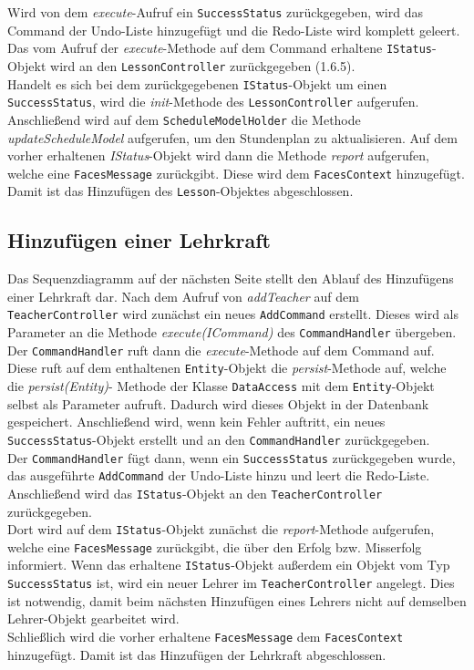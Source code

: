 \documentclass[fontsize=12pt,paper=a4,twoside]{scrartcl}
\begin{document}
Wird von dem \textit{execute}-Aufruf ein \texttt{SuccessStatus} zurückgegeben, wird das Command der Undo-Liste hinzugefügt und die Redo-Liste wird komplett geleert. Das vom Aufruf der \textit{execute}-Methode auf dem Command erhaltene \texttt{IStatus}-Objekt wird an den \texttt{LessonController} zurückgegeben (1.6.5). \\
Handelt es sich bei dem zurückgegebenen \texttt{IStatus}-Objekt um einen \texttt{SuccessStatus}, wird die \textit{init}-Methode des \texttt{LessonController} aufgerufen.\\
Anschließend wird auf dem \texttt{ScheduleModelHolder} die Methode \textit{updateScheduleModel} aufgerufen, um den Stundenplan zu aktualisieren. Auf dem vorher erhaltenen \textit{IStatus}-Objekt wird dann die Methode \textit{report} aufgerufen, welche eine \texttt{FacesMessage} zurückgibt. Diese wird dem \texttt{FacesContext} hinzugefügt. \\
Damit ist das Hinzufügen des \texttt{Lesson}-Objektes abgeschlossen.




\subsection{Hinzufügen einer Lehrkraft}
Das Sequenzdiagramm auf der nächsten Seite stellt den Ablauf des Hinzufügens einer Lehrkraft dar. Nach dem Aufruf von \textit{addTeacher} auf dem \texttt{TeacherController} wird zunächst ein neues \texttt{AddCommand} erstellt. Dieses wird als Parameter an die Methode \textit{execute(ICommand)} des \texttt{CommandHandler} übergeben. Der \texttt{CommandHandler} ruft dann die \textit{execute}-Methode auf dem Command auf. Diese ruft auf dem  enthaltenen \texttt{Entity}-Objekt die \textit{persist}-Methode auf, welche die \textit{persist(Entity)}- Methode der Klasse \texttt{DataAccess} mit dem \texttt{Entity}-Objekt selbst als Parameter aufruft. Dadurch wird dieses Objekt in der Datenbank gespeichert. Anschließend wird, wenn kein Fehler auftritt, ein neues \texttt{SuccessStatus}-Objekt erstellt und an den \texttt{CommandHandler} zurückgegeben.\\
Der \texttt{CommandHandler} fügt dann, wenn ein \texttt{SuccessStatus} zurückgegeben wurde, das ausgeführte \texttt{AddCommand} der Undo-Liste hinzu und leert die Redo-Liste. Anschließend wird das \texttt{IStatus}-Objekt an den \texttt{TeacherController} zurückgegeben.\\
Dort wird auf dem \texttt{IStatus}-Objekt zunächst die \textit{report}-Methode aufgerufen, welche eine \texttt{FacesMessage} zurückgibt, die über den Erfolg bzw. Misserfolg informiert. Wenn das erhaltene \texttt{IStatus}-Objekt außerdem ein Objekt vom Typ \texttt{SuccessStatus} ist, wird ein neuer Lehrer im \texttt{TeacherController} angelegt. Dies ist notwendig, damit beim nächsten Hinzufügen eines Lehrers nicht auf demselben Lehrer-Objekt gearbeitet wird.\\
Schließlich wird die vorher erhaltene \texttt{FacesMessage} dem \texttt{FacesContext} hinzugefügt. Damit ist das Hinzufügen der Lehrkraft abgeschlossen.
\end{document}
